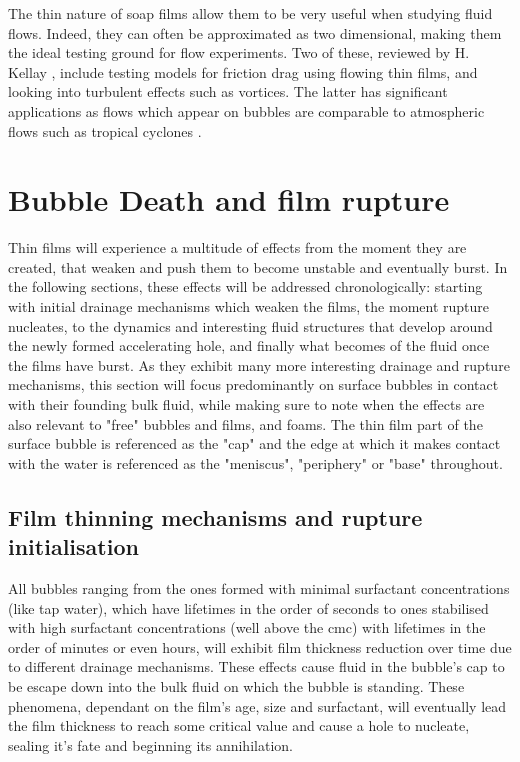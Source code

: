 \documentclass[a4paper,12pt]{article}
\numberwithin{equation}{section}
\numberwithin{figure}{section}
\numberwithin{table}{section}
\begin{document}
The thin nature of soap films allow them to be very useful when studying fluid flows. Indeed, they can often be approximated as two dimensional, making them the ideal testing ground for flow experiments. Two of these, reviewed by H. Kellay \cite{Kellay2017}, include testing models for friction drag using flowing thin films, and looking into turbulent effects such as vortices. The latter has significant applications as flows which appear on bubbles are comparable to atmospheric flows such as tropical cyclones \cite{Seychelles2008}.

\newpage
\section{Bubble Death and film rupture}
Thin films will experience a multitude of effects from the moment they are created, that weaken and push them to become unstable and eventually burst. In the following sections, these effects will be addressed chronologically: starting with initial drainage mechanisms which weaken the films, the moment rupture nucleates, to the dynamics and interesting fluid structures that develop around the newly formed accelerating hole, and finally what becomes of the fluid once the films have burst. As they exhibit many more interesting drainage and rupture mechanisms, this section will focus predominantly on surface bubbles in contact with their founding bulk fluid, while making sure to note when the effects are also relevant to "free" bubbles and films, and foams. The thin film part of the surface bubble is referenced as the "cap" and the edge at which it makes contact with the water is referenced as the "meniscus", "periphery" or "base" throughout.

\subsection{Film thinning mechanisms and rupture initialisation}
\label{sec:drainage}
All bubbles ranging from the ones formed with minimal surfactant concentrations (like tap water), which have lifetimes in the order of seconds \cite{Zheng1983, Lhuissier2011} to ones stabilised with high surfactant concentrations (well above the cmc) with lifetimes in the order of minutes or even hours, will exhibit film thickness reduction over time due to different drainage mechanisms. These effects cause fluid in the bubble's cap to be escape down into the bulk fluid on which the bubble is standing. These phenomena, dependant on the film's age, size and surfactant, will eventually lead the film thickness to reach some critical value and cause a hole to nucleate, sealing it's fate and beginning its annihilation.
\end{document}
